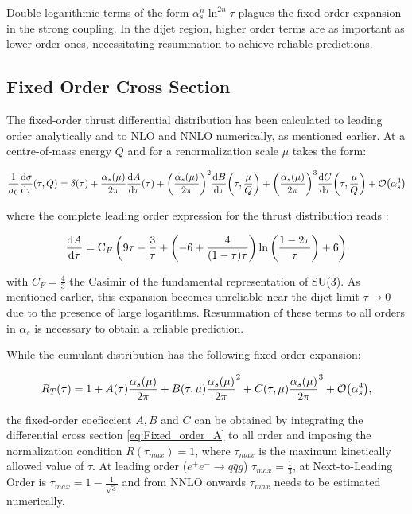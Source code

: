 \documentclass[../main.tex]{subfiles}
\begin{document}
Double logarithmic terms of the form $\alpha_s^n \ln^{2n}\tau$ plagues the fixed order expansion in the strong coupling. In the dijet region, higher order 
terms are as important as lower order ones, necessitating resummation to achieve reliable predictions.

\subsection{Fixed Order Cross Section}

The fixed-order thrust differential distribution has been calculated to leading order analytically and
to NLO and NNLO numerically, as mentioned earlier. At a centre-of-mass energy $Q$ and for a renormalization scale $\mu$ takes the form:

\begin{equation}\label{eq:Fixed_order}
    \frac{1}{\sigma_0} \dv{\sigma}{\tau} \qty(\tau,Q) = \delta(\tau) + \frac{\alpha_s(\mu)}{2\pi}\dv{A}{\tau} \qty(\tau) + \qty(\frac{\alpha_s(\mu)}{2\pi})^2 \dv{B}{\tau} \qty(\tau,\frac{\mu}{Q}) + \qty(\frac{\alpha_s(\mu)}{2\pi})^3 \dv{C}{\tau} \qty(\tau,\frac{\mu}{Q}) + \order{\alpha_s^4}
\end{equation}

where the complete leading order expression for the thrust distribution reads \cite{Ellis:1980wv}:

\begin{equation}\label{eq:Fixed_order_A}
    \dv{A}{\tau}(\tau) =  \text{C}_F \left(9 \tau -\frac{3}{\tau }+\left(-6 +\frac{4}{(1-\tau ) \tau }\right) \ln \left(\frac{1-2 \tau }{\tau }\right)+6\right)
\end{equation}

with $C_F = \frac{4}{3}$ the Casimir of the fundamental representation of SU(3). As mentioned earlier, this expansion becomes unreliable near the dijet limit $\tau \to 0$ due to the presence of large logarithms.
Resummation of these terms to all orders in $\alpha_s$ is necessary to obtain a reliable prediction.

While the cumulant distribution has the following fixed-order expansion:

\begin{equation}\label{eq:Fixed_order_R}
    R_T(\tau) = 1 + A(\tau) \frac{\alpha_s(\mu)}{2\pi} + B(\tau,\mu) \frac{\alpha_s(\mu)}{2\pi}^2 + C(\tau,\mu)\frac{\alpha_s(\mu)}{2\pi}^3 + \order{\alpha_s^4} ,
\end{equation}

the fixed-order coeficcient $A,B$ and $C$ can be obtained by integrating the differential cross section \cref{eq:Fixed_order_A} to all order and 
imposing the normalization condition $R(\tau_{max}) = 1$, where $\tau_{max}$ is the maximum kinetically allowed value of $\tau$. At leading order ($e^+e^- \to q\bar{q}g$) $\tau_{max}=\frac{1}{3}$, at Next-to-Leading Order
is $\tau_{max}=1-\frac{1}{\sqrt{3}}$ and from NNLO onwards $\tau_{max}$ needs to be estimated numerically.
\end{document}
